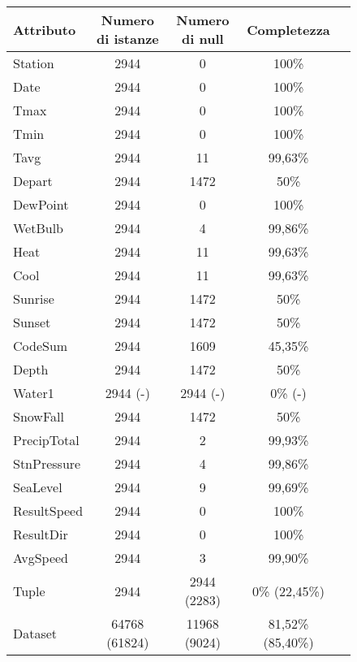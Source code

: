 \begin{figure}[H]
	\centering
	\begin{tabular}{lcccc}
		\toprule
		\textbf{Attributo} \quad & \textbf{Numero di istanze} & \textbf{Numero di null} & \textbf{Completezza} \\
		\midrule
		Station     &               2944  & 0                      & 100\%      \\ 
		Date        &               2944  & 0                      & 100\%      \\ 
		Tmax        &               2944  & 0                      & 100\%      \\ 
		Tmin        &               2944  & 0                      & 100\%      \\ 
		Tavg        &               2944  & 11                     & 99,63\%    \\ 
		Depart      &               2944  & 1472                   & 50\%       \\ 
		DewPoint    &               2944  & 0                      & 100\%      \\ 
		WetBulb     &               2944  & 4                      & 99,86\%    \\ 
		Heat        &               2944  & 11                     & 99,63\%    \\ 
		Cool        &               2944  & 11                     & 99,63\%    \\ 
		Sunrise     &               2944  & 1472                   & 50\%       \\ 
		Sunset      &               2944  & 1472                   & 50\%       \\ 
		CodeSum     &               2944  & 1609                   & 45,35\%    \\ 
		Depth       &               2944  & 1472                   & 50\%       \\ 
		Water1      &               2944 (-)  & 2944 (-)                  & 0\% (-)       \\ 
		SnowFall    &               2944  & 1472                   & 50\%       \\ 
		PrecipTotal &               2944  & 2                      & 99,93\%    \\ 
		StnPressure &               2944  & 4                      & 99,86\%    \\ 
		SeaLevel    &               2944  & 9                      & 99,69\%    \\ 
		ResultSpeed &               2944  & 0                      & 100\%      \\ 
		ResultDir   &               2944  & 0                      & 100\%      \\ 
		AvgSpeed    &               2944  & 3                      & 99,90\%	\\ 
		\midrule
		Tuple 		&				2944  &	2944 (2283)			   & 0\% (22,45\%)\\
		Dataset  	&	   64768 (61824)  &	11968 (9024) 		   & 81,52\% (85,40\%)\\
		\bottomrule
	\end{tabular}
	\label{tab:completezza weather}
\end{figure}

